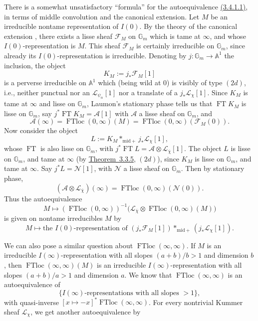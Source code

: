 There is a somewhat unsatisfactory ``formula'' for the autoequivalence
\hyperref[par:3.4.1.1]{(3.4.1.1)}, in terms of middle convolution and the
canonical extension. Let \(M\) be an irreducible nontame representation of
\(I(0)\). By the theory of the canonical extension \cite{Ka-LG}, there exists
a lisse sheaf \(\mathcal{F}_M\) on \(\mathbb{G}_m\) which is tame at
\(\infty\), and whose \(I(0)\)-representation is \(M\). This sheaf
\(\mathcal{F}_M\) is certainly irreducible on \(\mathbb{G}_m\), since already
its \(I(0)\)-representation is irreducible. Denoting by
\(j:\mathbb{G}_m\to\mathbb{A}^1\) the inclusion, the object
\[
  K_M:=j_*\mathcal{F}_M[1]
\]
is a perverse irreducible on \(\mathbb{A}^1\) which (being wild at \(0\)) is
visibly of type \((2d)\), i.e., neither punctual nor an
\(\mathcal{L}_{\psi_\alpha}[1]\) nor a translate of a
\(j_*\mathcal{L}_{\chi}[1]\). Since \(K_M\) is tame at \(\infty\) and lisse on
\(\mathbb{G}_m\), Laumon's stationary phase tells us that
\(\operatorname{FT}K_M\) is lisse on \(\mathbb{G}_m\), say
\(j^*\operatorname{FT}K_M=\mathcal{A}[1]\) with \(\mathcal{A}\) a lisse sheaf
on \(\mathbb{G}_m\), and
\[
  \mathcal{A}(\infty)
  =
  \operatorname{FTloc}(0,\infty)(M)
  =
  \operatorname{FTloc}(0,\infty)(\mathcal{F}_M(0)).
\]
Now consider the object
\[
  L:=K_M*_{\mathrm{mid}+}j_*\mathcal{L}_{\chi}[1],
\]
whose \(\operatorname{FT}\) is also lisse on \(\mathbb{G}_m\), with
\(j^*\operatorname{FT}L=\mathcal{A}\otimes\mathcal{L}_{\overline{\chi}}[1]\).
The object \(L\) is lisse on \(\mathbb{G}_m\), and tame at \(\infty\) (by
\hyperref[thm:3.3.5]{Theorem~3.3.5}, \((2d)\)), since \(K_M\) is lisse on
\(\mathbb{G}_m\), and tame at \(\infty\). Say \(j^*L=\mathcal{N}[1]\), with
\(\mathcal{N}\) a lisse sheaf on \(\mathbb{G}_m\). Then by stationary phase,
\[
  (\mathcal{A}\otimes\mathcal{L}_{\overline{\chi}})(\infty)
  =
  \operatorname{FTloc}(0,\infty)(\mathcal{N}(0)).
\]
Thus the autoequivalence
\[
  M\longmapsto
  (\operatorname{FTloc}(0,\infty))^{-1}
  \bigl(\mathcal{L}_{\overline{\chi}}\otimes
  \operatorname{FTloc}(0,\infty)(M)\bigr)
\]
is given on nontame irreducibles \(M\) by
\[
  M\longmapsto\text{the }I(0)\text{-representation of }
  (j_*\mathcal{F}_M[1])*_{\mathrm{mid}+}(j_*\mathcal{L}_{\chi}[1]).
\]

We can also pose a similar question about \(\operatorname{FTloc}(\infty,\infty)\).
If \(M\) is an irreducible \(I(\infty)\)-representation with all slopes
\((a+b)/b>1\) and dimension \(b\), then \(\operatorname{FTloc}(\infty,\infty)(M)\)
is an irreducible \(I(\infty)\)-representation with all slopes
\((a+b)/a>1\) and dimension \(a\). We know that
\(\operatorname{FTloc}(\infty,\infty)\) is an autoequivalence of
\[
  \{I(\infty)\text{-representations with all slopes }>1\},
\]
with quasi-inverse
\([x\mapsto -x]^*\operatorname{FTloc}(\infty,\infty)\). For every nontrivial
Kummer sheaf \(\mathcal{L}_{\chi}\), we get another autoequivalence by

